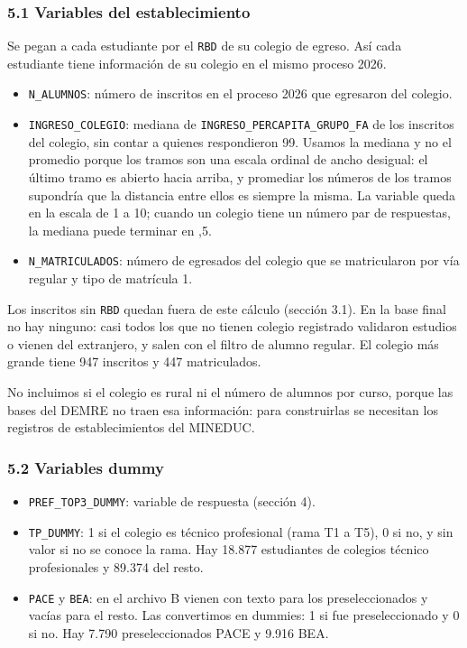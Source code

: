 \documentclass[11pt]{article}
\begin{document}
\subsubsection*{5.1 \; Variables del establecimiento}

Se pegan a cada estudiante por el \texttt{RBD} de su colegio de egreso.
Así cada estudiante tiene información de su colegio en el mismo proceso
2026.

\begin{itemize}[leftmargin=1.5em, itemsep=0.3em]
  \item \texttt{N\_ALUMNOS}: número de inscritos en el proceso 2026 que
        egresaron del colegio.
  \item \texttt{INGRESO\_COLEGIO}: mediana de
        \texttt{INGRESO\_PERCAPITA\_GRUPO\_FA} de los inscritos del
        colegio, sin contar a quienes respondieron 99. Usamos la mediana
        y no el promedio porque los tramos son una escala ordinal de
        ancho desigual: el último tramo es abierto hacia arriba, y
        promediar los números de los tramos supondría que la distancia
        entre ellos es siempre la misma. La variable queda en la escala de 1 a
        10; cuando un colegio tiene un número par de respuestas, la
        mediana puede terminar en ,5.
  \item \texttt{N\_MATRICULADOS}: número de egresados del colegio que se
        matricularon por vía regular y tipo de matrícula 1.
\end{itemize}

Los inscritos sin \texttt{RBD} quedan fuera de este cálculo (sección
3.1). En la base final no hay ninguno: casi todos los que no tienen
colegio registrado validaron estudios o vienen del extranjero, y salen con
el filtro de alumno regular. El colegio más grande tiene 947 inscritos y
447 matriculados.

No incluimos si el colegio es rural ni el número de alumnos por curso,
porque las bases del DEMRE no traen esa información: para construirlas
se necesitan los registros de establecimientos del MINEDUC.

\subsubsection*{5.2 \; Variables dummy}

\begin{itemize}[leftmargin=1.5em, itemsep=0.3em]
  \item \texttt{PREF\_TOP3\_DUMMY}: variable de respuesta (sección 4).
  \item \texttt{TP\_DUMMY}: 1 si el colegio es técnico profesional
        (rama T1 a T5), 0 si no, y sin valor si no se conoce la rama.
        Hay 18.877 estudiantes de colegios técnico profesionales y 89.374
        del resto.
  \item \texttt{PACE} y \texttt{BEA}: en el archivo B vienen con texto
        para los preseleccionados y vacías para el resto. Las
        convertimos en dummies: 1 si fue preseleccionado y 0 si no. Hay
        7.790 preseleccionados PACE y 9.916 BEA.
\end{itemize}
\end{document}
